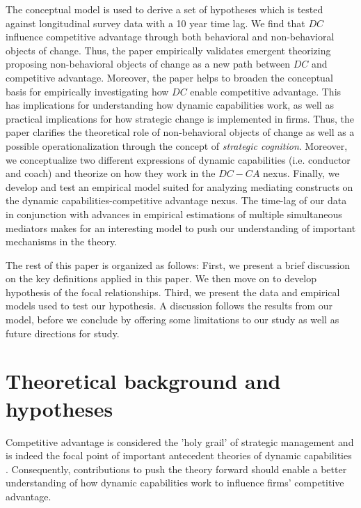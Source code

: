 \documentclass[review,fleqn]{elsarticle}\usepackage[]{graphicx}\usepackage[]{color}
\begin{document}
The conceptual model is used to derive a set of hypotheses which is tested against
longitudinal survey data with a 10 year time lag. We find that $DC$ influence competitive
advantage through both behavioral and non-behavioral objects of change. Thus, the paper
empirically validates emergent theorizing proposing non-behavioral objects of change as a
new path between $DC$ and competitive advantage. Moreover, the paper helps to broaden the
conceptual basis for empirically investigating how $DC$ enable competitive advantage. This
has implications for understanding how dynamic capabilities work, as well as practical
implications for how strategic change is implemented in firms. Thus, the paper clarifies
the theoretical role of non-behavioral objects of change as well as a possible
operationalization through the concept of \emph{strategic cognition}. Moreover, we
conceptualize two different expressions of dynamic capabilities (i.e. conductor and coach)
and theorize on how they work in the $DC-CA$ nexus. Finally, we develop and test an empirical model
suited for analyzing mediating constructs on the dynamic capabilities-competitive
advantage nexus. The time-lag of our data in conjunction with advances in empirical
estimations of multiple simultaneous mediators makes for an interesting model to push our
understanding of important mechanisms in the theory.

The rest of this paper is organized as follows: First, we present a brief discussion on
the key definitions applied in this paper. We then move on to develop hypothesis of the
focal relationships. Third, we present the data and empirical models used to test our
hypothesis. A discussion follows the results from our model, before we conclude by
offering some limitations to our study as well as future directions for study.

\section*{Theoretical background and hypotheses}

Competitive advantage is considered the ’holy grail’ of strategic management
\citep{Schilke2018} and is indeed the focal point of important antecedent theories of
dynamic capabilities \citep{Arndt2018,Pezeshkan2016b}. Consequently, contributions to push
the theory forward should enable a better understanding of how dynamic capabilities work
to influence firms’ competitive advantage.
\end{document}
